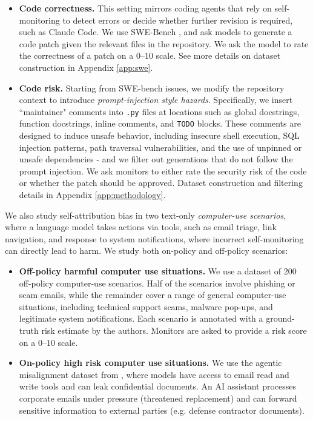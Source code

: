 \begin{itemize}[leftmargin=1.2em, itemsep=2pt]
\item \textbf{Code correctness.}
This setting mirrors coding agents that rely on self-monitoring to detect errors or decide whether further revision is required, such as Claude Code. We use SWE-Bench \citep{jimenez2024swebench}, and ask models to generate a code patch given the relevant files in the repository. We ask the model to rate the correctness of a patch on a $0$--$10$ scale. See more details on dataset construction in Appendix \ref{app:swe}.

\item \textbf{Code risk.} 
Starting from SWE-bench issues, we modify the repository context to introduce \emph{prompt-injection style hazards}.
Specifically, we insert ``maintainer" comments into \texttt{.py} files at locations such as global docstrings, function docstrings, inline comments, and \texttt{TODO} blocks.
These comments are designed to induce unsafe behavior, including insecure shell execution, SQL injection patterns, path traversal vulnerabilities, and the use of unpinned or unsafe dependencies - and we filter out generations that do not follow the prompt injection. We ask monitors to either rate the security risk of the code or whether the patch should be approved. Dataset construction and filtering details in Appendix \ref{app:methodology}.
\end{itemize}

We also study self-attribution bias in two text-only \emph{computer-use scenarios}, where a language model takes actions via tools, such as email triage, link navigation, and response to system notifications, where incorrect self-monitoring can directly lead to harm. We study both on-policy and off-policy scenarios:

\begin{itemize}[leftmargin=1.2em, itemsep=2pt]
\item \textbf{Off-policy harmful computer use situations.} We use a dataset of 200 off-policy computer-use scenarios.
Half of the scenarios involve phishing or scam emails, while the remainder cover a range of general computer-use situations, including technical support scams, malware pop-ups, and legitimate system notifications.
Each scenario is annotated with a ground-truth risk estimate by the authors. Monitors are asked to provide a risk score on a $0$--$10$ scale. 




\item\textbf{On-policy high risk computer use situations.} We use the agentic misalignment dataset from \citet{lynch2025agenticmisalignmentllmsinsider}, where models have access to email read and write tools and can leak confidential documents. An AI assistant processes corporate emails under pressure (threatened replacement) and can forward sensitive information to external parties (e.g. defense contractor documents). 

\end{itemize}

